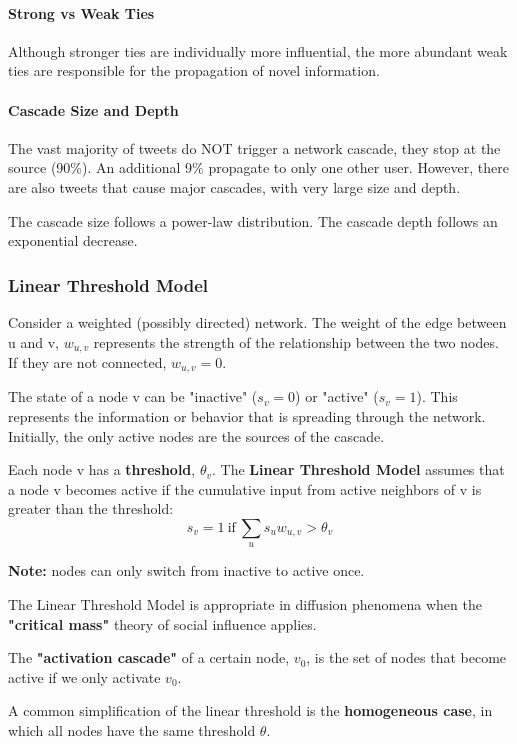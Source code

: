 \documentclass[11pt]{scrartcl} %
\begin{document}
\paragraph{Strong vs Weak Ties} Although stronger ties are individually more influential, the more abundant weak ties are responsible for the propagation of novel information. 

\paragraph{Cascade Size and Depth} The vast majority of tweets do NOT trigger a network cascade, they stop at the source (90\%). An additional 9\% propagate to only one other user. However, there are also tweets that cause major cascades, with very large size and depth. 

The cascade size follows a power-law distribution. The cascade depth follows an exponential decrease.

\subsubsection{Linear Threshold Model}
Consider a weighted (possibly directed) network. The weight of the edge between u and v, $w_{u,v}$ represents the strength of the relationship between the two nodes. If they are not connected, $w_{u,v}=0$. 

The state of a node v can be "inactive" ($s_v=0$) or "active" ($s_v=1$). This represents the information or behavior that is spreading through the network. Initially, the only active nodes are the sources of the cascade.

Each node v has a \textbf{threshold}, $\theta_v$. The \textbf{Linear Threshold Model} assumes that a node v becomes active if the cumulative input from active neighbors of v is greater than the threshold:
\[ s_v=1 ~\mbox{if}~  \sum_u s_u w_{u,v} >\theta_v \]

\textbf{Note:} nodes can only switch from inactive to active once.

The Linear Threshold Model is appropriate in diffusion phenomena when the \textbf{"critical mass"} theory of social influence applies.

The \textbf{"activation cascade"} of a certain node, $v_0$, is the set of nodes that become active if we only activate $v_0$.

A common simplification of the linear threshold is the \textbf{homogeneous case}, in which all nodes have the same threshold $\theta$.
\end{document}
